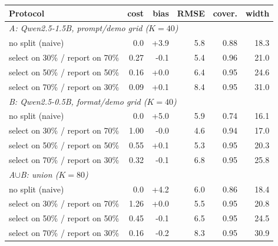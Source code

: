 \begin{tabular}{lrrrrr}\toprule
Protocol & cost & bias & RMSE & cover. & width \\\midrule
\multicolumn{6}{l}{\emph{A: Qwen2.5-1.5B, prompt/demo grid ($K{=}40$)}} \\
no split (naive) & 0.0 & +3.9 & 5.8 & 0.88 & 18.3 \\
select on 30\% / report on 70\% & 0.27 & -0.1 & 5.4 & 0.96 & 21.0 \\
select on 50\% / report on 50\% & 0.16 & +0.0 & 6.4 & 0.95 & 24.6 \\
select on 70\% / report on 30\% & 0.09 & +0.1 & 8.4 & 0.95 & 31.0 \\
\multicolumn{6}{l}{\emph{B: Qwen2.5-0.5B, format/demo grid ($K{=}40$)}} \\
no split (naive) & 0.0 & +5.0 & 5.9 & 0.74 & 16.1 \\
select on 30\% / report on 70\% & 1.00 & -0.0 & 4.6 & 0.94 & 17.0 \\
select on 50\% / report on 50\% & 0.55 & +0.1 & 5.3 & 0.95 & 20.3 \\
select on 70\% / report on 30\% & 0.32 & -0.1 & 6.8 & 0.95 & 25.8 \\
\multicolumn{6}{l}{\emph{A$\cup$B: union ($K{=}80$)}} \\
no split (naive) & 0.0 & +4.2 & 6.0 & 0.86 & 18.4 \\
select on 30\% / report on 70\% & 1.26 & +0.0 & 5.5 & 0.95 & 20.8 \\
select on 50\% / report on 50\% & 0.45 & -0.1 & 6.5 & 0.95 & 24.5 \\
select on 70\% / report on 30\% & 0.16 & -0.2 & 8.3 & 0.95 & 30.9 \\
\bottomrule
\end{tabular}
